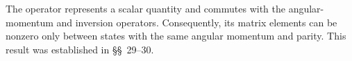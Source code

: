 The operator represents a scalar quantity and commutes with the angular-momentum and inversion operators. Consequently, its matrix elements can be nonzero only between states with the same angular momentum and parity. This result was established in \S\S~29--30.

